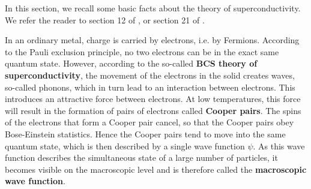 \documentclass[a4paper, draft]{article}
\theoremstyle{own}
\theoremstyle{remark}
\begin{document}
In this section, we recall some basic facts about the theory of superconductivity. We refer the reader to section 12 of \cite{Kittel}, \cite{GrossMarxLectureNotes} or section 21 of \cite{FeynmanIII}.

In an ordinary metal, charge is carried by electrons, i.e. by Fermions. According to the Pauli exclusion principle, no two electrons can be in the exact same quantum state. However, according to the so-called {\bf BCS theory of superconductivity}, the movement of the electrons in the solid creates waves, so-called phonons, which in turn lead to an interaction between electrons. This introduces an attractive force between electrons. At low temperatures, this force will result in the formation of pairs of electrons called {\bf Cooper pairs}. The spins of the electrons that form a Cooper pair cancel, so that the Cooper pairs obey Bose-Einstein statistics. Hence the Cooper pairs tend to move into the same quantum state, which is then described by a single wave function $\psi$. As this wave function describes the simultaneous state of a large number of particles, it becomes visible on the macroscopic level and is therefore called the {\bf macroscopic wave function}. 
\end{document}
